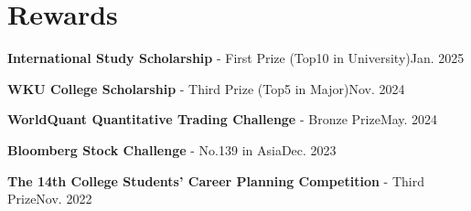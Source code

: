 \documentclass{resume}
\begin{document}
\section{Rewards}
\textbf{International Study Scholarship} -  First Prize (Top10 in University)\hfill{Jan. 2025}

\textbf{WKU College Scholarship} - Third Prize (Top5 in Major)\hfill{Nov. 2024}

\textbf{WorldQuant Quantitative Trading Challenge} - Bronze Prize\hfill{May. 2024}

\textbf{Bloomberg Stock Challenge} - No.139 in Asia\hfill{Dec. 2023}

\textbf{The 14th College Students' Career Planning Competition} - Third Prize\hfill{Nov. 2022}
\end{document}
